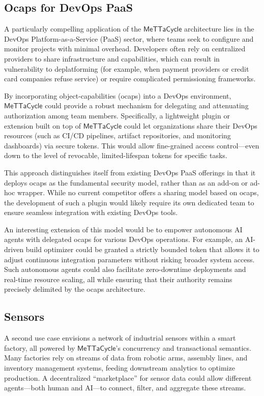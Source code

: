 \documentclass{article}
\newcommand{\MC}{\mathsf{MeTTaCycle}}
\begin{document}
\subsection{Ocaps for DevOps PaaS}

A particularly compelling application of the $\MC$ architecture lies in the DevOps Platform-as-a-Service (PaaS) sector, where teams seek to configure and monitor projects with minimal overhead. Developers often rely on centralized providers to share infrastructure and capabilities, which can result in vulnerability to deplatforming (for example, when payment providers or credit card companies refuse service) or require complicated permissioning frameworks.

By incorporating object-capabilities (ocaps) into a DevOps environment, $\MC$ could provide a robust mechanism for delegating and attenuating authorization among team members. Specifically, a lightweight plugin or extension built on top of $\MC$ could let organizations share their DevOps resources (such as CI/CD pipelines, artifact repositories, and monitoring dashboards) via secure tokens. This would allow fine-grained access control---even down to the level of revocable, limited-lifespan tokens for specific tasks.

This approach distinguishes itself from existing DevOps PaaS offerings in that it deploys ocaps as the fundamental security model, rather than as an add-on or ad-hoc wrapper. While no current competitor offers a sharing model based on ocaps, the development of such a plugin would likely require its own dedicated team to ensure seamless integration with existing DevOps tools.

An interesting extension of this model would be to empower autonomous AI agents with delegated ocaps for various DevOps operations. For example, an AI-driven build optimizer could be granted a strictly bounded token that allows it to adjust continuous integration parameters without risking broader system access. Such autonomous agents could also facilitate zero-downtime deployments and real-time resource scaling, all while ensuring that their authority remains precisely delimited by the ocaps architecture.

\subsection{Sensors}

A second use case envisions a network of industrial sensors within a smart factory, all powered by $\MC$'s concurrency and transactional semantics. Many factories rely on streams of data from robotic arms, assembly lines, and inventory management systems, feeding downstream analytics to optimize production. A decentralized “marketplace” for sensor data could allow different agents---both human and AI---to connect, filter, and aggregate these streams.
\end{document}
